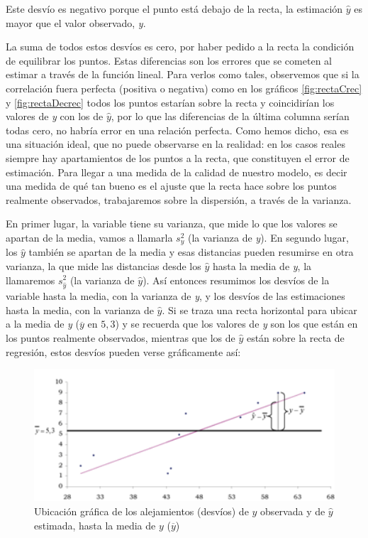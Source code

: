 \documentclass[]{book}
\begin{document}
Este desvío es negativo porque el punto está debajo de la recta, la
estimación \(\widehat{y}\) es mayor que el valor observado, \emph{y}.

La suma de todos estos desvíos es cero, por haber pedido a la recta la
condición de equilibrar los puntos. Estas diferencias son los errores
que se cometen al estimar a través de la función lineal. Para verlos
como tales, observemos que si la correlación fuera perfecta (positiva o
negativa) como en los gráficos \ref{fig:rectaCrec} y \ref{fig:rectaDecrec} todos los puntos estarían sobre la
recta y coincidirían los valores de \emph{y} con los de \(\widehat{y}\), por lo
que las diferencias de la última columna serían todas cero, no habría
error en una relación perfecta. Como hemos dicho, esa es una situación
ideal, que no puede observarse en la realidad: en los casos reales
siempre hay apartamientos de los puntos a la recta, que constituyen el
error de estimación. Para llegar a una medida de la calidad de nuestro
modelo, es decir una medida de qué tan bueno es el ajuste que la recta
hace sobre los puntos realmente observados, trabajaremos sobre la
dispersión, a través de la varianza.

En primer lugar, la variable tiene su varianza, que mide lo que los
valores se apartan de la media, vamos a llamarla \(s_{y}^{2}\) (la
varianza de \emph{y}). En segundo lugar, los \(\widehat{y}\) también se apartan
de la media y esas distancias pueden resumirse en otra varianza, la que
mide las distancias desde los \(\widehat{y}\) hasta la media de \emph{y}, la
llamaremos \(s_{\widehat{y}}^{2}\) (la varianza de \(\widehat{y}\)). Así
entonces resumimos los desvíos de la variable hasta la media, con la
varianza de \emph{y}, y los desvíos de las estimaciones hasta la media, con
la varianza de \(\widehat{y}\). Si se traza una recta horizontal para
ubicar a la media de \emph{y} (\(\overline{y}\) en \(5,3\)) y se recuerda que los
valores de \emph{y} son los que están en los puntos realmente observados,
mientras que los de \(\widehat{y}\) están sobre la recta de regresión,
estos desvíos pueden verse gráficamente así:

\begin{figure}

{\centering \includegraphics[width=4.78in]{imagenes/grafico14} 

}

\caption{Ubicación gráfica de los alejamientos (desvíos) de $y$ observada y de $\widehat{y}$ estimada, hasta la media de $y$ ($\overline{y}$)}\label{fig:unnamed-chunk-163}
\end{figure}
\end{document}
